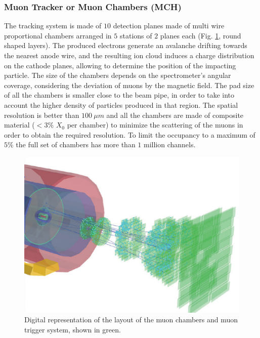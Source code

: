 \subsubsection{Muon Tracker or Muon Chambers (MCH)}
The tracking system is made of $10$ detection planes made of multi wire proportional chambers arranged in $5$ stations of $2$ planes each (Fig. \ref{fig:mch_mtr}, round shaped layers).
The produced electrons generate an avalanche drifting towards the nearest anode wire, and the resulting ion cloud induces a charge distribution on the cathode planes, allowing to determine the position of the impacting particle.
The size of the chambers depends on the spectrometer’s angular coverage, considering the deviation of muons by the magnetic field.
The pad size of all the chambers is smaller close to the beam pipe, in order to take into account the higher density of particles produced in that region.
The spatial resolution is better than $100\ \mu m$ and all the chambers are made of composite material ($< 3\%$ $X_0$ per chamber) to minimize the scattering of the muons in order to obtain the required resolution. 
To limit the occupancy to a maximum of $5\%$ the full set of chambers has more than $1$ million channels.

\begin{figure}[!h]
\begin{center}
\includegraphics[width=\linewidth]{Chapters/Introduction/Figs/muon_mtr_mch.pdf}
\caption{Digital representation of the layout of the muon chambers and muon trigger system, shown in green.}
\label{fig:mch_mtr}
\end{center}
\end{figure}

